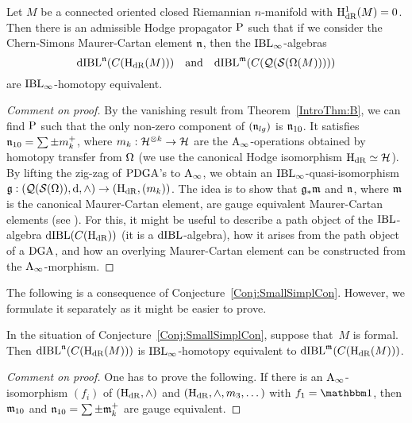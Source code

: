 \documentclass[\MainFolder/Text.tex]{subfiles}
\begin{document}
\begin{Conjecture}\label{Conj:SmallSimplCon}
Let $M$ be a connected oriented closed Riemannian $n$-manifold with $\mathrm{H}_{\mathrm{dR}}^1(M) = 0$. Then there is an admissible Hodge propagator $\mathrm{P}$ such that if we consider the Chern-Simons Maurer-Cartan element $\mathfrak{n}$, then the $\mathrm{IBL}_\infty$-algebras 
$$\mathrm{dIBL}^{\mathfrak{n}}(C(\mathrm{H}_{\mathrm{dR}}(M)))\quad\text{and}\quad\mathrm{dIBL}^{\mathfrak{m}}(C(\mathcal{Q}(\mathcal{S}(\Omega(M))))) $$
are $\mathrm{IBL}_\infty$-homotopy equivalent.
\end{Conjecture}
\begin{proof}[Comment on proof]
By the vanishing result from Theorem~\ref{IntroThm:B}, we can find $\mathrm{P}$ such that the only non-zero component of $(\mathfrak{n}_{lg})$ is $\mathfrak{n}_{10}$.
It satisfies $\mathfrak{n}_{10} = \sum \pm m_k^+$, where $m_k: \mathcal{H}^{\otimes k} \rightarrow \mathcal{H}$ are the $\mathrm{A}_\infty$-operations obtained by homotopy transfer from $\Omega$ (we use the canonical Hodge isomorphism $\mathrm{H}_{\mathrm{dR}}\simeq\mathcal{H}$).
By lifting the zig-zag of $\mathrm{PDGA}$'s to $\mathrm{A}_\infty$, we obtain an $\mathrm{IBL}_\infty$-quasi-isomorphism $\mathfrak{g}: (\mathcal{Q}(\mathcal{S}(\Omega)),\mathrm{d},\wedge) \rightarrow (\mathrm{H}_{\mathrm{dR}},(m_k))$.
The idea is to show that $\mathfrak{g}_*\mathfrak{m}$ and $\mathfrak{n}$, where $\mathfrak{m}$ is the canonical Maurer-Cartan element, are gauge equivalent Maurer-Cartan elements (see \cite[Definition~9.7]{Cieliebak2015}).
For this, it might be useful to describe a path object of the $\mathrm{IBL}$-algebra $\mathrm{dIBL}(C(\mathrm{H}_{\mathrm{dR}}))$ (it is a $\mathrm{dIBL}$-algebra), how it arises from the path object of a $\mathrm{DGA}$, and how an overlying Maurer-Cartan element can be constructed from the $\mathrm{A}_\infty$-morphism.
\end{proof}

The following is a consequence of Conjecture~\ref{Conj:SmallSimplCon}.
However, we formulate it separately as it might be easier to prove.

\begin{Conjecture}\label{Cor:FormCorollary}
In the situation of Conjecture~\ref{Conj:SmallSimplCon}, suppose that~$M$ is formal. Then $\mathrm{dIBL}^{\mathfrak{n}}(C(\mathrm{H}_{\mathrm{dR}}(M)))$ is $\mathrm{IBL}_\infty$-homotopy equivalent to $\mathrm{dIBL}^{\mathfrak{m}}(C(\mathrm{H}_{\mathrm{dR}}(M)))$.
\end{Conjecture}
\begin{proof}[Comment on proof]
One has to prove the following. If there is an $\mathrm{A}_\infty$-isomorphism $(f_i)$ of $(\mathrm{H}_{\mathrm{dR}},\wedge)$ and $(\mathrm{H}_{\mathrm{dR}},\wedge,m_3,\dotsc)$ with $f_1 = \Id$, then $\mathfrak{m}_{10}$ and $\mathfrak{n}_{10} = \sum \pm \mathfrak{m}_k^+$ are gauge equivalent.
\end{proof}
\end{document}
